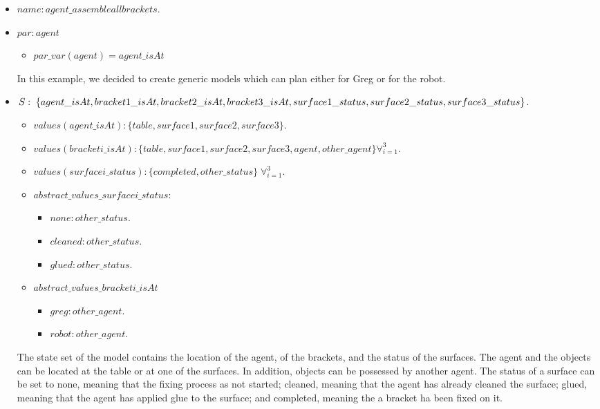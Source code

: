 \begin{itemize}
	\item $name: agent\_assembleallbrackets$.
	\item		$par: agent$
		\begin{itemize}
			\item $par\_var(agent)=agent\_isAt$
		\end{itemize}
		In this example, we decided to create generic models which can plan either for Greg or for the robot.
	\item $S:\;\{agent\_isAt,bracket1\_isAt,bracket2\_isAt,bracket3\_isAt,surface1\_status,\\ surface2\_status,surface3\_status\}$. 
		\begin{itemize}
			\item $values(agent\_isAt):\{table,surface1,surface2,surface3\}$.
			\item $values(bracketi\_isAt):\{table,surface1,surface2,surface3,agent,other\_agent\} \forall_{i=1}^3$. 
			\item $values(surfacei\_status):\{completed,other\_status\}\;\forall_{i=1}^3$.
		\end{itemize}
		\begin{itemize}
			\item $abstract\_values\_surfacei\_status:$ 
				\begin{itemize}
					\item $none: other\_status$.
					\item $cleaned: other\_status$.
					\item $glued: other\_status$.
				\end{itemize}
			\item $abstract\_values\_bracketi\_isAt$ 
				\begin{itemize}
					\item $greg: other\_agent$.
					\item $robot: other\_agent$.
				\end{itemize}	
		\end{itemize}
		The state set of the model contains the location of the agent, of the brackets, and the status of the surfaces. The agent and the objects can be located at the table or at one of the surfaces. In addition, objects can be possessed by another agent. The status of a surface can be set to none, meaning that the fixing process as not started; cleaned, meaning that the agent has already cleaned the surface; glued, meaning that the agent has applied glue to the surface; and completed, meaning the a bracket ha been fixed on it. 


\end{itemize}
